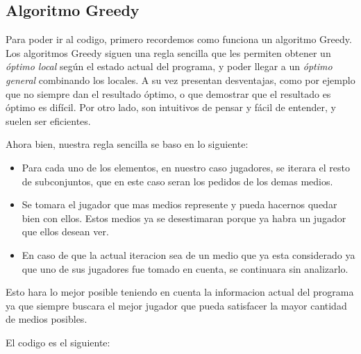 \subsection{Algoritmo Greedy}

Para poder ir al codigo, primero recordemos como funciona un algoritmo Greedy. Los algoritmos Greedy siguen una regla sencilla que les permiten obtener un \textit{óptimo local} según el estado actual del programa, y poder llegar a un \textit{óptimo general} combinando los locales. A su vez presentan desventajas, como por ejemplo que no siempre dan el resultado óptimo, o que demostrar que el resultado es óptimo es difícil. Por otro lado, son intuitivos de pensar y fácil de entender, y suelen ser eficientes.

Ahora bien, nuestra regla sencilla se baso en lo siguiente:
\begin{itemize}
    \item Para cada uno de los elementos, en nuestro caso jugadores, se iterara el resto de subconjuntos, que en este caso seran los pedidos de los demas medios.
    \item Se tomara el jugador que mas medios represente y pueda hacernos quedar bien con ellos. Estos medios ya se desestimaran porque ya habra un jugador que ellos desean ver.
    \item En caso de que la actual iteracion sea de un medio que ya esta considerado ya que uno de sus jugadores fue tomado en cuenta, se continuara sin analizarlo.
\end{itemize}

Esto hara lo mejor posible teniendo en cuenta la informacion actual del programa ya que siempre buscara el mejor jugador que pueda satisfacer la mayor cantidad de medios posibles.

El codigo es el siguiente:



